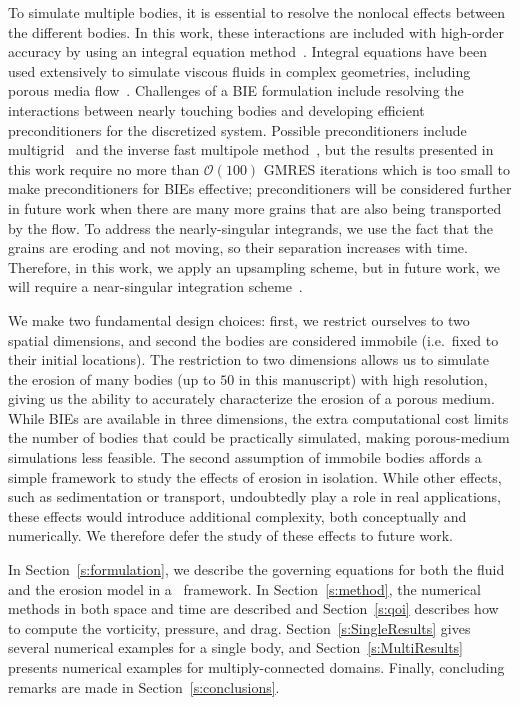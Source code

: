 \documentclass[preprint, 10pt]{elsarticle}
\begin{document}
To simulate multiple bodies, it is essential to resolve the nonlocal
effects between the different bodies.  In this work, these interactions
are included with high-order accuracy by using an integral equation
method~\cite{poz1992}.  Integral equations have been used extensively to
simulate viscous fluids in complex geometries, including porous media
flow~\cite{dea-qua-bir-jua2018, bar-mar-vee-zha2016}. Challenges of a
BIE formulation include resolving the interactions between nearly
touching bodies and developing efficient preconditioners for the
discretized system.  Possible preconditioners include
multigrid~\cite{qua-bir2015a} and the inverse fast multipole
method~\cite{qua-cou-dar2018}, but the results presented in this work
require no more than $\mathcal{O}(100)$ GMRES iterations which is too
small to make preconditioners for BIEs effective; preconditioners will
be considered further in future work when there are many more grains
that are also being transported by the flow.  To address the
nearly-singular integrands, we use the fact that the grains are eroding
and not moving, so their separation increases with time.  Therefore, in
this work, we apply an upsampling scheme, but in future work, we will
require a near-singular integration scheme~\cite{qua-bir2014a,
klo-bar-gre-one2013, bar-wu-vee2015, hel-oja2008a, bea-lai2001}.


We make two fundamental design choices: first, we restrict ourselves to two spatial dimensions, and second the bodies are considered immobile (i.e.~fixed to their initial locations). The restriction to two dimensions allows us to simulate the erosion of many bodies (up to $50$ in this manuscript) with high resolution, giving us the ability to accurately characterize the erosion of a porous medium. While BIEs are available in three dimensions, the extra computational cost limits the number of bodies that could be practically simulated, making porous-medium simulations less feasible. The second assumption of immobile bodies affords a simple framework to study the effects of erosion in isolation. While other effects, such as sedimentation or transport, undoubtedly play a role in real applications, these effects would introduce additional complexity, both conceptually and numerically. We therefore defer the study of these effects to future work.

In Section~\ref{s:formulation}, we describe the governing equations for
both the fluid and the erosion model in a \thL~framework.  In
Section~\ref{s:method}, the numerical methods in both space and time are
described and Section~\ref{s:qoi} describes how to compute the
vorticity, pressure, and drag.  Section~\ref{s:SingleResults} gives
several numerical examples for a single body, and
Section~\ref{s:MultiResults} presents numerical examples for
multiply-connected domains.  Finally, concluding remarks are made in
Section~\ref{s:conclusions}.
\end{document}
